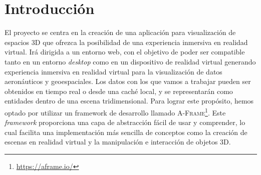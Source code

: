 \documentclass[a4paper, 11pt]{book}
\begin{document}


\tableofcontents 
\cleardoublepage
\listoffigures %



\cleardoublepage
\chapter{Introducción}
\label{sec:intro} %
El proyecto se centra en la creación de una aplicación para visualización de espacios \textsc{3D} que ofrezca la posibilidad de una experiencia inmersiva en realidad virtual.
Irá dirigida a un entorno web, con el objetivo de poder ser compatible tanto en un entorno \emph{desktop} como en un dispositivo de realidad virtual generando experiencia inmersiva en realidad virtual para la visualización de datos aeronáuticos y geoespaciales. 
Los datos con los que vamos a trabajar pueden ser obtenidos en tiempo real o desde una caché local, y se representarán como entidades dentro de una escena tridimensional.
Para lograr este propósito, hemos optado por utilizar un \Gls{framework} de desarrollo llamado \textsc{A-Frame}\footnote{\url{https://aframe.io/}}. Este \emph{framework} proporciona una capa de abstracción fácil de usar y comprender, lo cual facilita una implementación más sencilla de conceptos como la creación de escenas en realidad virtual y la manipulación e interacción de objetos \textsc{3D}. 
\end{document}
